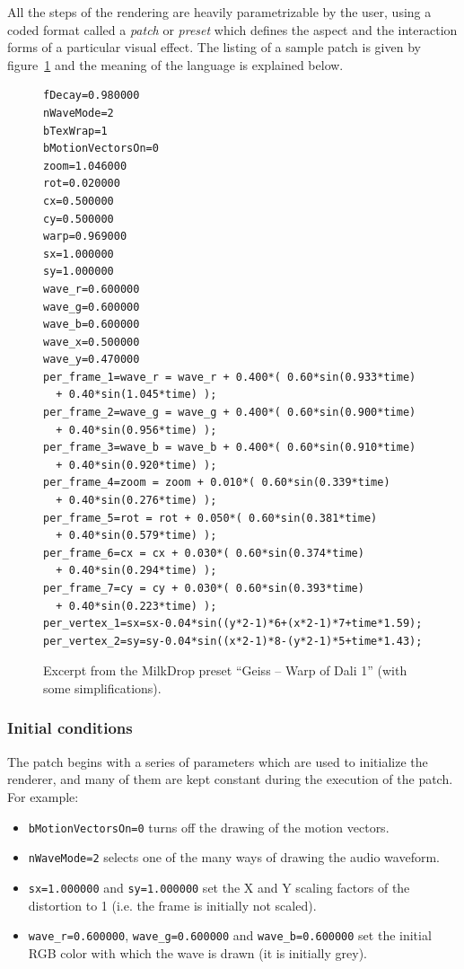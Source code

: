 \documentclass[a4paper,11pt]{kthesis}
\begin{document}
All the steps of the rendering are heavily parametrizable by the user, using a coded format called a \textit{patch} or \textit{preset} which defines the aspect and the interaction forms of a particular visual effect. The listing of a sample patch is given by figure~\ref{fig:samplepatch} and the meaning of the language is explained below.

\begin{figure}
\centering
\begin{boxedminipage}{13cm}
\begin{verbatim}
fDecay=0.980000
nWaveMode=2
bTexWrap=1
bMotionVectorsOn=0
zoom=1.046000
rot=0.020000
cx=0.500000
cy=0.500000
warp=0.969000
sx=1.000000
sy=1.000000
wave_r=0.600000
wave_g=0.600000
wave_b=0.600000
wave_x=0.500000
wave_y=0.470000
per_frame_1=wave_r = wave_r + 0.400*( 0.60*sin(0.933*time)
  + 0.40*sin(1.045*time) );
per_frame_2=wave_g = wave_g + 0.400*( 0.60*sin(0.900*time)
  + 0.40*sin(0.956*time) );
per_frame_3=wave_b = wave_b + 0.400*( 0.60*sin(0.910*time)
  + 0.40*sin(0.920*time) );
per_frame_4=zoom = zoom + 0.010*( 0.60*sin(0.339*time)
  + 0.40*sin(0.276*time) );
per_frame_5=rot = rot + 0.050*( 0.60*sin(0.381*time)
  + 0.40*sin(0.579*time) );
per_frame_6=cx = cx + 0.030*( 0.60*sin(0.374*time)
  + 0.40*sin(0.294*time) );
per_frame_7=cy = cy + 0.030*( 0.60*sin(0.393*time)
  + 0.40*sin(0.223*time) );
per_vertex_1=sx=sx-0.04*sin((y*2-1)*6+(x*2-1)*7+time*1.59);
per_vertex_2=sy=sy-0.04*sin((x*2-1)*8-(y*2-1)*5+time*1.43);
\end{verbatim}
\end{boxedminipage}
\caption{Excerpt from the MilkDrop preset ``Geiss -- Warp of Dali 1'' (with some simplifications).}
\label{fig:samplepatch}
\end{figure}

\subsubsection{Initial conditions}
The patch begins with a series of parameters which are used to initialize the renderer, and many of them are kept constant during the execution of the patch. For example:
\begin{itemize}
\item \verb!bMotionVectorsOn=0! turns off the drawing of the motion vectors.
\item \verb!nWaveMode=2! selects one of the many ways of drawing the audio waveform.
\item \verb!sx=1.000000! and \verb!sy=1.000000! set the X and Y scaling factors of the distortion to 1 (i.e. the frame is initially not scaled).
\item \verb!wave_r=0.600000!, \verb!wave_g=0.600000! and \verb!wave_b=0.600000! set the initial RGB color with which the wave is drawn (it is initially grey).
\end{itemize}
\end{document}
